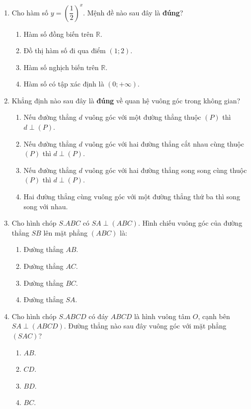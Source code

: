 \documentclass[12pt, a4paper]{article}
\begin{document}
\begin{enumerate}[leftmargin=0.8cm]
    \item Cho hàm số $y = \left(\dfrac{1}{2}\right)^x$. Mệnh đề nào sau đây là \textbf{đúng}?
    \begin{enumerate}[leftmargin=0.6cm]
        \item[A.] Hàm số đồng biến trên $\mathbb{R}$.
        \item[B.] Đồ thị hàm số đi qua điểm $(1; 2)$.
        \item[C.] Hàm số nghịch biến trên $\mathbb{R}$.
        \item[D.] Hàm số có tập xác định là $(0; +\infty)$.
    \end{enumerate}

    \item Khẳng định nào sau đây là \textbf{đúng} về quan hệ vuông góc trong không gian?
    \begin{enumerate}[leftmargin=0.6cm]
        \item[A.] Nếu đường thẳng $d$ vuông góc với một đường thẳng thuộc $(P)$ thì $d \perp (P)$.
        \item[B.] Nếu đường thẳng $d$ vuông góc với hai đường thẳng cắt nhau cùng thuộc $(P)$ thì $d \perp (P)$.
        \item[C.] Nếu đường thẳng $d$ vuông góc với hai đường thẳng song song cùng thuộc $(P)$ thì $d \perp (P)$.
        \item[D.] Hai đường thẳng cùng vuông góc với một đường thẳng thứ ba thì song song với nhau.
    \end{enumerate}

    \item Cho hình chóp $S.ABC$ có $SA \perp (ABC)$. Hình chiếu vuông góc của đường thẳng $SB$ lên mặt phẳng $(ABC)$ là:
    \begin{enumerate}[leftmargin=0.6cm]
        \item[A.] Đường thẳng $AB$.
        \item[B.] Đường thẳng $AC$.
        \item[C.] Đường thẳng $BC$.
        \item[D.] Đường thẳng $SA$.
    \end{enumerate}

    \item Cho hình chóp $S.ABCD$ có đáy $ABCD$ là hình vuông tâm $O$, cạnh bên $SA \perp (ABCD)$. Đường thẳng nào sau đây vuông góc với mặt phẳng $(SAC)$?
    \begin{enumerate}[leftmargin=0.6cm]
        \item[A.] $AB$.
        \item[B.] $CD$.
        \item[C.] $BD$.
        \item[D.] $BC$.
    \end{enumerate}


\end{enumerate}
\end{document}
